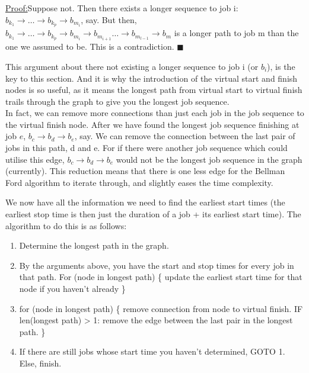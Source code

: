 \documentclass[paper=a4, fontsize=12pt]{scrartcl} %
\newenvironment{claimproof}[1]{\par\noindent\underline{Proof:}\space#1}{\hfill $\blacksquare$}
\numberwithin{equation}{section}       %
\numberwithin{figure}{section}         %
\numberwithin{table}{section}          %
\begin{document}
\begin{claimproof}
Suppose not. Then there exists a longer sequence to job i: $b_{k_{1}} \to \dots \to b_{k_{p}} \to b_{m_{i}}$, say. But then, $b_{k_{1}} \to \dots \to b_{k_{p}} \to b_{m_{i}} \to b_{m_{i+1}} \dots \to b_{m_{l-1}} \to b_{m}$ is a longer path to job m than the one we assumed to be. This is a contradiction.
\end{claimproof}

This argument about there not existing a longer sequence to job i (or $b_{i}$), is the key to this section. And it is why the introduction of the virtual start and finish nodes is so useful, as it means the longest path from virtual start to virtual finish trails through the graph to give you the longest job sequence. \\ 

In fact, we can remove more connections than just each job in the job sequence to the virtual finish node. After we have found the longest job sequence finishing at job $e$, $b_{c} \to b_{d} \to b_{e}$, say. We can remove the connection between the last pair of jobs in this path, d and e. For if there were another job sequence which could utilise this edge, $b_{c} \to b_{d} \to b_{e}$ would not be the longest job sequence in the graph (currently). This reduction means that there is one less edge for the Bellman Ford algorithm to iterate through, and slightly eases the time complexity.

We now have all the information we need to find the earliest start times (the earliest stop time is then just the duration of a job + its earliest start time). The algorithm to do this is as follows:

\begin{enumerate}
\item Determine the longest path in the graph.
\item  By the arguments above, you have the start and stop times for every job in that path. For (node in longest path) \{ update the earliest start time for that node if you haven't already \}
\item for (node in longest path) \{ remove connection from node to virtual finish.
IF len(longest path) > 1: remove the edge between the last pair in the longest path.
\}
\item If there are still jobs whose start time you haven't determined, GOTO 1. Else, finish.
\end{enumerate}
\end{document}
